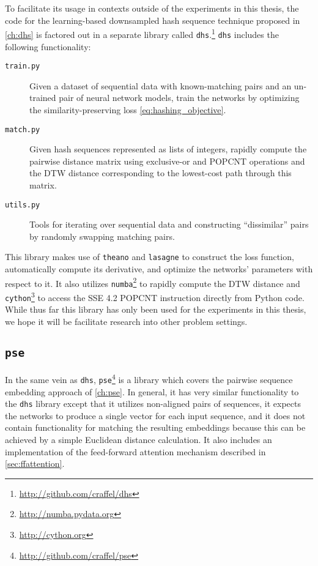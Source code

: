 To facilitate its usage in contexts outside of the experiments in this thesis, the code for the learning-based downsampled hash sequence technique proposed in \cref{ch:dhs} is factored out in a separate library called \texttt{dhs}.\footnote{\url{http://github.com/craffel/dhs}}
\texttt{dhs} includes the following functionality:
\begin{description}
\item[\texttt{train.py}] Given a dataset of sequential data with known-matching pairs and an un-trained pair of neural network models, train the networks by optimizing the similarity-preserving loss \cref{eq:hashing_objective}.
\item[\texttt{match.py}] Given hash sequences represented as lists of integers, rapidly compute the pairwise distance matrix using exclusive-or and POPCNT operations and the DTW distance corresponding to the lowest-cost path through this matrix.
\item[\texttt{utils.py}] Tools for iterating over sequential data and constructing ``dissimilar'' pairs by randomly swapping matching pairs.
\end{description}
This library makes use of \texttt{theano} \cite{bergstra2010theano,bastien2012theano} and \texttt{lasagne} \cite{dieleman2015lasagne} to construct the loss function, automatically compute its derivative, and optimize the networks' parameters with respect to it.
It also utilizes \texttt{numba}\footnote{\url{http://numba.pydata.org}} to rapidly compute the DTW distance and \texttt{cython}\footnote{\url{http://cython.org}} to access the SSE 4.2 POPCNT instruction directly from Python code.
While thus far this library has only been used for the experiments in this thesis, we hope it will be facilitate research into other problem settings.

\subsection{\texttt{pse}}

In the same vein as \texttt{dhs}, \texttt{pse}\footnote{\url{http://github.com/craffel/pse}} is a library which covers the pairwise sequence embedding approach of \cref{ch:pse}.
In general, it has very similar functionality to the \texttt{dhs} library except that it utilizes non-aligned pairs of sequences, it expects the networks to produce a single vector for each input sequence, and it does not contain functionality for matching the resulting embeddings because this can be achieved by a simple Euclidean distance calculation.
It also includes an implementation of the feed-forward attention mechanism described in \cref{sec:ffattention}.

